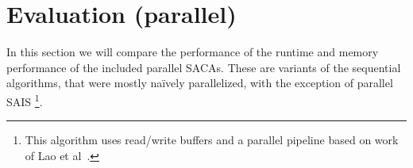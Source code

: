 
\section{Evaluation (parallel)}

In this section we will compare the performance of the runtime and memory performance of the included parallel SACAs.
These are variants of the sequential algorithms, that were mostly na\"ively parallelized, with the exception of parallel SAIS
\footnote{This algorithm uses read/write buffers and a parallel pipeline based on work of Lao et al~\cite{psais}.}.

